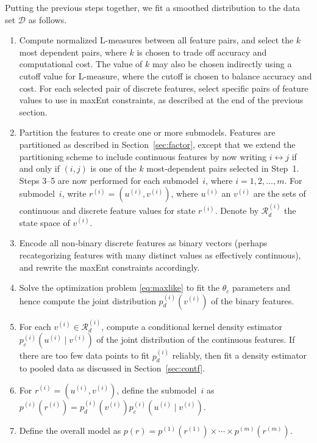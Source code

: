 \documentclass[11pt]{article}
\newcommand{\xD}{\mathcal{D}}
\newcommand{\xR}{\mathcal{R}}
\begin{document}
Putting the previous steps together, we fit a smoothed distribution to the data set $\xD$ as follows.
\begin{enumerate}
\item Compute normalized L-measures between all feature pairs, and select the $k$ most dependent pairs, where $k$ is chosen to trade off accuracy and computational cost. The value of $k$ may also be chosen indirectly using a cutoff value for L-measure, where the cutoff is chosen to balance accuracy and cost. For each selected pair of discrete features, select specific pairs of feature values to use in maxEnt constraints, as described at the end of the previous section.
\item Partition the features to create one or more submodels. Features are partitioned as described in Section~\ref{sec:factor}, except that we extend the partitioning scheme to include continuous features by now writing $i\leftrightarrow j$ if and only if $(i,j)$ is one of the $k$ most-dependent pairs selected in Step~1. Steps 3--5 are now performed for each submodel~$i$, where $i=1,2,\ldots,m$. For submodel~$i$, write $r^{(i)}=(u^{(i)},v^{(i)})$, where $u^{(i)}$ an $v^{(i)}$ are the sets of continuous and discrete feature values for state $r^{(i)}$. Denote by $\xR_d^{(i)}$ the state space of $v^{(i)}$.
\item Encode all non-binary discrete features as binary vectors (perhaps recategorizing features with many distinct values as effectively continuous), and rewrite the maxEnt constraints accordingly.
\item Solve the optimization problem \eqref{eq:maxlike} to fit the $\theta_c$ parameters and hence compute the joint distribution $p_d^{(i)}(v^{(i)})$ of the binary features.
\item For each $v^{(i)}\in\xR_d^{(i)}$, compute a conditional kernel density estimator $p_c^{(i)}(u^{(i)}\mid v^{(i)})$ of the joint distribution of the continuous features. If there are too few data points to fit $p_d^{(i)}$ reliably, then fit a density estimator to pooled data as discussed in Section~\ref{sec:contf}.
\item For $r^{(i)}=(u^{(i)},v^{(i)})$, define the submodel~$i$ as $p^{(i)}(r^{(i)})=p_d^{(i)}(v^{(i)})p_c^{(i)}(u^{(i)}\mid v^{(i)})$.
\item Define the overall model as $p(r)=p^{(1)}(r^{(1)})\times\cdots\times p^{(m)}(r^{(m)})$.
\end{enumerate}





\end{document}
